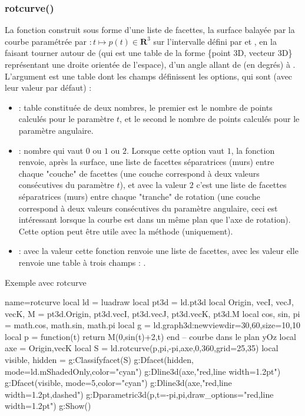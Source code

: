 \subsubsection{rotcurve()}
La fonction  construit sous forme d'une liste de facettes, la surface balayée par la courbe paramétrée par $\colon t\mapsto p(t)\in \mathbf R^3$ sur l'intervalle défini par  et , en la faisant tourner autour de  (qui est une table de la forme \{point 3D, vecteur 3D\} représentant une droite orientée de l'espace), d'un angle allant de  (en degrés) à . L'argument  est une table dont les champs définissent les options, qui sont (avec leur valeur  par défaut) :
    \begin{itemize}
        \item {} : table constituée de deux nombres, le premier est le nombre de points calculés pour le paramètre $t$, et le second le nombre de points calculés pour le paramètre angulaire.

        \item {} : nombre qui vaut $0$ ou $1$ ou $2$. Lorsque cette option vaut $1$, la fonction renvoie, après la surface, une liste de facettes séparatrices (murs) entre chaque "couche" de facettes (une couche correspond à deux valeurs consécutives du paramètre $t$), et avec la valeur $2$ c'est une liste de facettes séparatrices (murs) entre chaque "tranche" de rotation (une couche correspond à deux valeurs consécutives du paramètre angulaire, ceci est intéressant lorsque la courbe est dans un même plan que l'axe de rotation). Cette option peut être utile avec la méthode  (uniquement).
        
        \item {} : avec la valeur \false cette fonction renvoie une liste de facettes, avec les valeur \true elle renvoie une table à trois champs : .           
    \end{itemize} 
        
\begin{demo}{Exemple avec rotcurve}
\begin{luadraw}{name=rotcurve}
local ld = luadraw
local pt3d = ld.pt3d
local Origin, vecI, vecJ, vecK, M = pt3d.Origin, pt3d.vecI, pt3d.vecJ, pt3d.vecK, pt3d.M
local cos, sin, pi = math.cos, math.sin, math.pi
local g = ld.graph3d:new{viewdir={30,60},size={10,10}}
local p = function(t) return M(0,sin(t)+2,t) end -- courbe dans le plan yOz
local axe = {Origin,vecK}
local S = ld.rotcurve(p,pi,-pi,axe,0,360,{grid={25,35}})
local visible, hidden = g:Classifyfacet(S)
g:Dfacet(hidden, {mode=ld.mShadedOnly,color="cyan"})
g:Dline3d(axe,"red,line width=1.2pt")
g:Dfacet(visible, {mode=5,color="cyan"})
g:Dline3d(axe,"red,line width=1.2pt,dashed")
g:Dparametric3d(p,{t={-pi,pi},draw_options="red,line width=1.2pt"})
g:Show()
\end{luadraw}
\end{demo}

